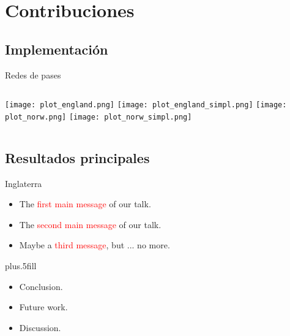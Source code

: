 \documentclass{beamer}
\begin{document}
\section{Contribuciones}

\subsection{Implementación}

\begin{frame}{Redes de pases}
    \begin{columns}[t]
        \texttt{[image: plot\_england.png]}
        \texttt{[image: plot\_england\_simpl.png]}
        \texttt{[image: plot\_norw.png]}
        \texttt{[image: plot\_norw\_simpl.png]}
    \end{columns} 
\end{frame}

%
\subsection{Resultados principales}

\begin{frame}{Inglaterra}
	\begin{itemize}
		\item The \textcolor{red}{first main message} of our talk.
		\item The \textcolor{red}{second main message} of our talk.
		\item Maybe a \textcolor{red}{third message}, but ... no more.
	\end{itemize}
	\vskip0pt plus.5fill
	\begin{itemize}
		\item Conclusion.
	\end{itemize}
	\begin{itemize}
		\item Future work.
		\item Discussion.
	\end{itemize}
\end{frame}
\end{document}
